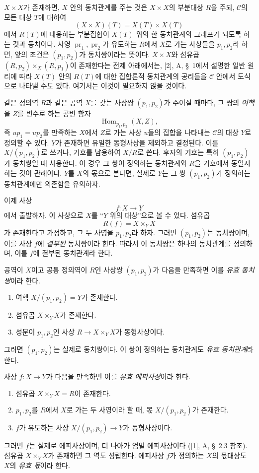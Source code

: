 \documentclass[11pt,twoside,openany]{book}
\numberwithin{equation}{section}
\newcommand{\sourceunit}{front}
\newcommand{\src}[1]{%
  \phantomsection\hypertarget{src:\sourceunit:#1}{}%
  \marginpar{\raggedleft\footnotesize\sffamily #1}%
}
\theoremstyle{plain}
\theoremstyle{definition}
\theoremstyle{remark}
\begin{document}
$X\times X$가 존재하면, $X$ 안의 동치관계를 주는 것은 $X\times X$의
부분대상 $R$을 주되, $\mathcal C$의 모든 대상 $T$에 대하여
\[
  (X\times X)(T)=X(T)\times X(T)
\]
에서 $R(T)$에 대응하는 부분집합이 $X(T)$ 위의 한 동치관계의
그래프가 되도록 하는 것과 동치이다. 사영
$\operatorname{pr}_1,\operatorname{pr}_2$가 유도하는 $R$에서 $X$로
가는 사상들을 $p_1,p_2$라 하면, 앞의 조건은 $(p_1,p_2)$가
동치쌍이라는 뜻이다. $X\times X$와 섬유곱
$(R,p_2)\times_X(R,p_1)$이 존재한다는 전제 아래에서는, [2], A,
\S~1에서 설명한 일반 원리에 따라 $X(T)$ 안의 $R(T)$에 대한 집합론적
동치관계의 공리들을 $\mathcal C$ 안에서 도식으로 나타낼 수도 있다.
여기서는 이것이 필요하지 않을 것이다.

같은 정의역 $R$과 같은 공역 $X$를 갖는 사상쌍 $(p_1,p_2)$가 주어질
때마다, 그 쌍의 \emph{여핵}을 $Z$를 변수로 하는 공변 함자
\[
  \operatorname{Hom}_{p_1,p_2}(X,Z),
\]
즉 $up_1=up_2$를 만족하는 $X$에서 $Z$로 가는 사상 $u$들의 집합을
나타내는 $\mathcal C$의 대상 $Y$로 정의할 수 있다. $Y$가 존재하면
유일한 동형사상을 제외하고 결정된다. 이를 $X/(p_1,p_2)$로 쓰거나,
기호를 남용하여 $X/R$로 쓴다. 후자의 기호는 특히
\src{101}$(p_1,p_2)$가 동치쌍일 때 사용한다. 이 경우 그 쌍이 정의하는
동치관계와 $R$을 기호에서 동일시하는 것이 관례이다. $Y$를 $X$의
몫으로 본다면, 실제로 $Y$는 그 쌍 $(p_1,p_2)$가 정의하는 동치관계에만
의존함을 유의하자.

이제 사상
\[
  f:X\longrightarrow Y
\]
에서 출발하자. 이 사상으로 $X$를 ``$Y$ 위의 대상''으로 볼 수 있다.
섬유곱
\[
  R(f)=X\times_Y X
\]
가 존재한다고 가정하고, 그 두 사영을 $p_1,p_2$라 하자. 그러면
$(p_1,p_2)$는 동치쌍이며, 이를 사상 $f$에 \emph{결부된} 동치쌍이라
한다. 따라서 이 동치쌍은 하나의 동치관계를 정의하며, 이를 $f$에
결부된 동치관계라 한다.

공역이 $X$이고 공통 정의역이 $R$인 사상쌍 $(p_1,p_2)$가 다음을
만족하면 이를 \emph{유효 동치쌍}이라 한다.
\begin{enumerate}
  \item[(i)] 여핵 $X/(p_1,p_2)=Y$가 존재한다.
  \item[(ii)] 섬유곱 $X\times_Y X$가 존재한다.
  \item[(iii)] 성분이 $p_1,p_2$인 사상
  $R\longrightarrow X\times_Y X$가 동형사상이다.
\end{enumerate}
그러면 $(p_1,p_2)$는 실제로 동치쌍이다. 이 쌍이 정의하는 동치관계도
\emph{유효 동치관계}라 한다.

사상 $f:X\longrightarrow Y$가 다음을 만족하면 이를 \emph{유효
에피사상}이라 한다.
\begin{enumerate}
  \item[(i)] 섬유곱 $X\times_Y X=R$이 존재한다.
  \item[(ii)] $p_1,p_2$를 $R$에서 $X$로 가는 두 사영이라 할 때,
  몫 $X/(p_1,p_2)$가 존재한다.
  \item[(iii)] $f$가 유도하는 사상
  $X/(p_1,p_2)\longrightarrow Y$가 동형사상이다.
\end{enumerate}
그러면 $f$는 실제로 에피사상이며, 더 나아가 엄밀 에피사상이다
([1], A, \S~2.3 참조). 섬유곱 $X\times_Y X$가 존재하면 그 역도
성립한다. 에피사상 $f$가 정의하는 $X$의 몫대상도 $X$의
\emph{유효 몫}이라 한다.
\end{document}
